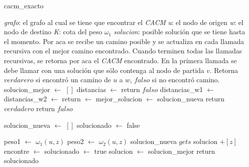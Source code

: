 \begin{algorithm}[!h]
\caption{cacm\_exacto} \label{exacto:pseudo}
\end{algorithm}
\begin{algorithmic}[1]
	\Require \emph{grafo}: el grafo al cual se tiene que encontrar el \emph{CACM}
	\Require \emph{u}: el nodo de origen
	\Require \emph{w}: el nodo de destino
	\Require \emph{K}: cota del peso $\omega_1$
	\Require \emph{solucion}: posible soluci\'on que se tiene hasta el momento. Por aca se recibe un camino posible y se actualiza en cada llamada recursiva con el mejor camino encontrado. Cuando terminen todas las llamadas recursivas, se retorna por aca el \emph{CACM} encontrado. En la primera llamada se debe llamar con una soluci\'on que s\'olo contenga al nodo de partida $v$.
	\Statex
	\Ensure Retorna $verdarero$ si encontr\'o un camino de $u$ a $w$, $falso$ si no encontr\'o camino.
	\Statex
	\State solucion\_mejor $\gets$ $[]$
	\Statex
		\State distancias $\gets$ 
			\State return $falso$
		\Else
			\State distancias\_w1 $\gets$ 
			\State distancias\_w2 $\gets$ 
			\State return $\gets$ 
		\EndIf
	\EndProcedure
	\Statex
				\State mejor\_solucion $\gets$ solucion\_nueva
				\State return $verdadero$
			\Else
				\State return $falso$
			\EndIf
		\EndIf
		
		\State solucion\_nueva $\gets$ $[]$
		\State solucionado $\gets$ false

		\State {}
			\State peso1 $\gets$ $\omega_1({u, z})$
			\State peso2 $\gets$ $\omega_2({u, z})$
				\State {}
				\State solucion\_nueva $gets$ solucion $+ [z]$
				\State encontre $\gets$ 
					\State solucionado $\gets$ true
				\EndIf
				\State {}
			\EndIf
		\EndIf
		\EndFor
		\State {}
			\State solucion $\gets$ solucion\_mejor
		\EndIf
		\State return solucionado
	\EndProcedure
\end{algorithmic}

